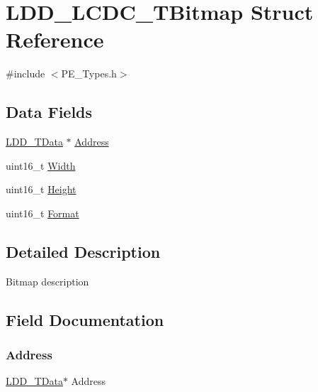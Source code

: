 \hypertarget{struct_l_d_d___l_c_d_c___t_bitmap}{}\section{L\+D\+D\+\_\+\+L\+C\+D\+C\+\_\+\+T\+Bitmap Struct Reference}
\label{struct_l_d_d___l_c_d_c___t_bitmap}


{\ttfamily \#include $<$P\+E\+\_\+\+Types.\+h$>$}

\subsection*{Data Fields}
\begin{DoxyCompactItemize}
\item 
\hyperlink{group___p_e___types__module_gade8ef9401405bd941b6da738b807f980}{L\+D\+D\+\_\+\+T\+Data} $\ast$ \hyperlink{struct_l_d_d___l_c_d_c___t_bitmap_a9454c3a7668f1e977ad0799b8224a103}{Address}
\item 
uint16\+\_\+t \hyperlink{struct_l_d_d___l_c_d_c___t_bitmap_a9b3fe5d83fe7eb60cd86008934f65616}{Width}
\item 
uint16\+\_\+t \hyperlink{struct_l_d_d___l_c_d_c___t_bitmap_a1a634e0d0d740b55406a6c2c194a7bfc}{Height}
\item 
uint16\+\_\+t \hyperlink{struct_l_d_d___l_c_d_c___t_bitmap_a547dd9962073fbbde513a1155bae9118}{Format}
\end{DoxyCompactItemize}


\subsection{Detailed Description}
Bitmap description 

\subsection{Field Documentation}
\mbox{\label{struct_l_d_d___l_c_d_c___t_bitmap_a9454c3a7668f1e977ad0799b8224a103}} 
\subsubsection{\texorpdfstring{Address}{Address}}
{\footnotesize\ttfamily \hyperlink{group___p_e___types__module_gade8ef9401405bd941b6da738b807f980}{L\+D\+D\+\_\+\+T\+Data}$\ast$ Address}

